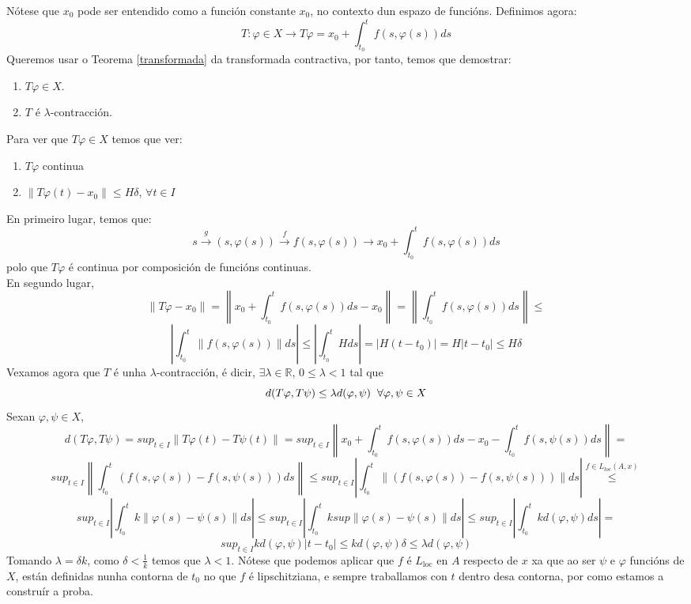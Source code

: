 \documentclass[11pt, a4paper,twoside]{article}
\makeatletter
\theoremstyle{theorem-style}  %
\renewenvironment{proof}[1][\proofname]{\par
	\pushQED{\qed}%
	\normalfont \topsep6\p@\@plus6\p@\relax
	\list{}{%
		\settowidth{\leftmargin}{\quad:\hskip\labelsep}%
		\setlength{\labelwidth}{0pt}%
		\setlength{\itemindent}{-\leftmargin}%
	}%
	\item[\hskip\labelsep\itshape#1\@addpunct{:}]\ignorespaces
}{%
	\popQED\endlist\@endpefalse
}
\theoremstyle{definition-style}
\theoremstyle{example-style}
\providecommand{\norm}[1]{\left\lVert#1\right\rVert} %
\providecommand{\abs}[1]{\left\lvert#1\right\rvert} %
\makeatother
\begin{document}
\begin{proof}
	Nótese que $ x_0 $ pode ser entendido como a función constante $ x_0 $, no contexto dun espazo de funcións. Definimos agora:
	\[T:\varphi \in X \longrightarrow T\varphi = x_0 + \int_{t_0}^{t} f(s, \varphi(s))ds\]
	Queremos usar o Teorema \ref{transformada} da transformada contractiva, por tanto, temos que demostrar:
	\begin{enumerate}
		\item $T\varphi \in X$.
		\item $T$ é $\lambda$-contracción.
	\end{enumerate}
	Para ver que $T\varphi \in X$ temos que ver:
	\begin{enumerate}[	i.]
		\item $T\varphi$ continua
		\item $\norm{T\varphi (t) - x_0} \leq H\delta$, $\forall t \in I$
	\end{enumerate}
	En primeiro lugar, temos que:
	\[s \stackrel{g}{\longrightarrow} (s, \varphi (s)) \stackrel{f}{\longrightarrow} f(s, \varphi (s)) \longrightarrow x_0 + \int_{t_0}^{t}f(s,\varphi (s))ds  \]
	polo que $T\varphi$ é continua por composición de funcións continuas. \\
	En segundo lugar, 
	\[\norm{T\varphi - x_0} = \norm{x_0 + \int_{t_0}^{t} f(s, \varphi (s)) ds - x_0} = \norm{\int_{t_0}^{t} f(s, \varphi (s)) ds} \leq \]
	\[\abs{\int_{t_0}^{t} \norm{f(s, \varphi (s))}ds} \leq \abs{\int_{t_0}^{t} H ds} = \abs{H(t - t_0)} = H\abs{t - t_0} \leq H\delta \]
	Vexamos agora que $T$ é unha $\lambda$-contracción, é dicir, $\exists \lambda \in \mathbb{R}$, $0 \leq \lambda < 1$ tal que
	\[d(T\varphi, T\psi) \leq \lambda d(\varphi, \psi) \hspace{0,2cm} \forall \varphi, \psi \in X\]
	Sexan $\varphi, \psi \in X$, \\
	\[d(T\varphi, T\psi) = sup_{t \in I} \norm{T\varphi (t) - T\psi (t)} = sup_{t \in I} \norm{x_0 + \int_{t_0}^{t} f(s, \varphi(s))ds - x_0 - \int_{t_0}^{t} f(s, \psi(s))ds} = \]
	\[sup_{t \in I} \norm{\int_{t_0}^{t} (f(s, \varphi(s)) - f(s, \psi(s)))ds} \leq sup_{t \in I} \abs{\int_{t_0}^{t} \norm{(f(s, \varphi(s)) - f(s, \psi(s)))}ds} \stackrel{f \in L_{loc} (A, x)}{\leq} \] 
	\[sup_{t \in I} \abs{\int_{t_0}^{t} k\norm{\varphi(s) - \psi(s)}ds} \leq sup_{t \in I} \abs{\int_{t_0}^{t} k sup\norm{\varphi(s) - \psi(s)}ds} \leq sup_{t \in I} \abs{\int_{t_0}^{t} k d(\varphi, \psi)ds} = \]
	\[sup_{t \in I} kd(\varphi, \psi)\abs{t - t_0} \leq kd(\varphi, \psi)\delta \leq \lambda d(\varphi, \psi)\]
	Tomando $\lambda = \delta k$, como $\delta < \frac{1}{k}$ temos que $\lambda < 1$. Nótese que podemos aplicar que $ f $ é $ L_{\text{loc}} $ en $ A $ respecto de $ x $ xa que ao ser $ \psi $ e $ \varphi $ funcións de $ X $, están definidas nunha contorna de $ t_0 $ no que $ f $ é lipschitziana, e sempre traballamos con $ t $ dentro desa contorna, por como estamos a construír a proba.
	

\end{proof}
\end{document}
